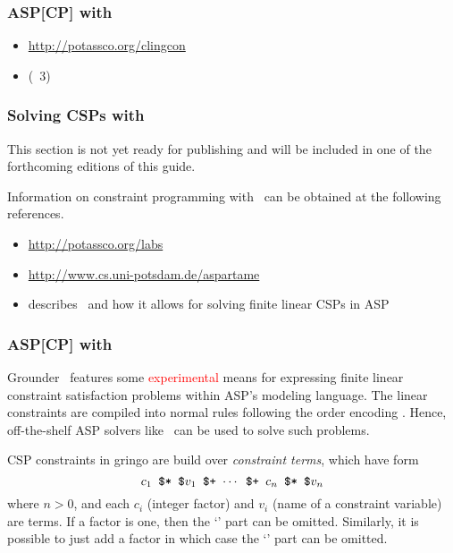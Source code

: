 \subsubsection{ASP[CP] with \clingcon}
\label{sec:clingcon}

\begin{itemize}
\item \url{http://potassco.org/clingcon}
\item \cite{bakaossc16a} (\clingcon~3)
\end{itemize}

\subsubsection{Solving CSPs with \aspartame}
\label{sec:aspartame}

This section is not yet ready for publishing
and will be included in one of the forthcoming editions of this guide.

Information on constraint programming with \aspartame\ can be obtained at the following references.

\begin{itemize}
\item \url{http://potassco.org/labs}
\item \url{http://www.cs.uni-potsdam.de/aspartame}
\item \cite{bageinscsotawe13a} describes \aspartame\ and how it allows for solving finite linear CSPs in ASP
\end{itemize}

\subsubsection{ASP[CP] with \gringo}

Grounder \gringo\ features some \textcolor{red}{experimental} means for expressing finite linear constraint satisfaction problems within ASP's modeling language.
The linear constraints are compiled into normal rules following the order encoding \cite{tatakiba09a,bageinscsotawe13a}.
Hence, off-the-shelf ASP solvers like \clasp\ can be used to solve such problems.

CSP constraints in gringo are build over \emph{constraint terms}, which have form
\[\texttt{$c_1$~\$*~\$$v_1$~\$+~$\cdots$~\$+~$c_n$~\$*~\$$v_n$}\]
where $n>0$, and each $c_i$ (integer factor) and $v_i$ (name of a constraint variable) are terms.
If a factor is one, then the `' part can be omitted.
Similarly, it is possible to just add a factor in which case the `' part can be omitted.

